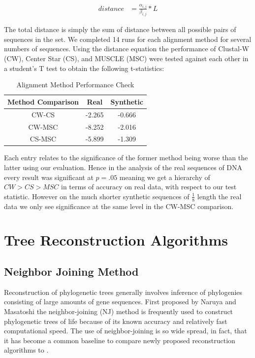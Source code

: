 \documentclass[10pt,twocolumn]{article}
\begin{document}
\begin{align*}
  distance &= \frac{\alpha_{i,j}}{\beta_{i,j}} * L
\end{align*}

The total distance is simply the sum of distance between all possible pairs of sequences in the set. We completed 14 runs for each alignment method for several numbers of sequences. Using the distance equation the performance of Clustal-W (CW), Center Star (CS), and MUSCLE (MSC) were tested against each other in a student's T test to obtain the following t-statistics:
\begin{table}[ht] 
\caption{Alignment Method Performance Check} %
\centering %
\begin{tabular}{c c c} %
\hline\hline %
Method Comparison & Real & Synthetic \\ [0.5ex] %
\hline %
CW-CS & -2.265 & -0.666\\ %
CW-MSC & -8.252 & -2.016\\ 
CS-MSC & -5.899 & -1.309 \\ [1ex] %
\hline %
\end{tabular} 
\label{table:nonlin} %
\end{table} 

Each entry relates to the significance of the former method being worse than the latter using our evaluation. Hence in the analysis of the real sequences of DNA every result was significant at $p=.05$ meaning we get a hierarchy of $CW>CS>MSC$ in terms of accuracy on real data, with respect to our test statistic. However on the much shorter synthetic sequences of $\frac{1}{8}$ length the real data we only see significance at the same level in the CW-MSC comparison.

\section*{Tree Reconstruction Algorithms}
\subsection*{Neighbor Joining Method}
Reconstruction of phylogenetic trees generally involves inference of phylogenies consisting of large amounts of gene sequences. First proposed by Naruya and Masatoshi \cite{saitou1987neighbor} the neighbor-joining (NJ) method is frequently used to construct phylogenetic trees of life because of its known accuracy and relatively fast computational speed. The use of neighbor-joining is so wide spread, in fact, that it has become a common baseline to compare newly proposed reconstruction algorithms to \cite{mihaescu2009neighbor}.
\end{document}
